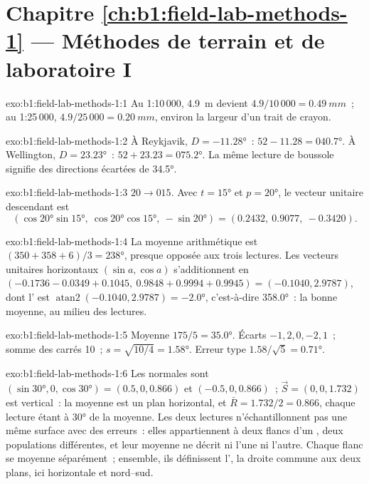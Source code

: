 \section*{Chapitre \ref{ch:b1:field-lab-methods-1} --- Méthodes de terrain et de laboratoire I}

\begin{solution}{exo:b1:field-lab-methods-1:1}
Au 1:10\,000, \qty{4.9}{m} devient $4.9/10\,000 = \qty{0.49}{mm}$~; au
1:25\,000, $4.9/25\,000 = \qty{0.20}{mm}$, environ la largeur d'un trait de crayon.
\end{solution}

\begin{solution}{exo:b1:field-lab-methods-1:2}
À Reykjavik, $D = \ang{-11.28}$~: $52 - 11.28 = \ang{040.7}$. À Wellington,
$D = \ang{+23.23}$~: $52 + 23.23 = \ang{075.2}$. La même lecture de boussole
signifie des directions écartées de \ang{34.5}.
\end{solution}

\begin{solution}{exo:b1:field-lab-methods-1:3}
$20\to015$. Avec $t = \ang{15}$ et $p = \ang{20}$, le vecteur unitaire descendant est
\[
  (\cos\ang{20}\sin\ang{15},\ \cos\ang{20}\cos\ang{15},\ -\sin\ang{20}) =
  (0.2432,\ 0.9077,\ -0.3420).
\]
\end{solution}

\begin{solution}{exo:b1:field-lab-methods-1:4}
La moyenne arithmétique est $(350 + 358 + 6)/3 = \ang{238}$, presque opposée aux
trois lectures. Les vecteurs unitaires horizontaux $(\sin a, \cos a)$ s'additionnent en
$(-0.1736 - 0.0349 + 0.1045,\ 0.9848 + 0.9994 + 0.9945) = (-0.1040, 2.9787)$,
dont l' est $\operatorname{atan2}(-0.1040, 2.9787) = \ang{-2.0}$, c'est-à-dire
\ang{358.0}~: la bonne moyenne, au milieu des lectures.
\end{solution}

\begin{solution}{exo:b1:field-lab-methods-1:5}
Moyenne $175/5 = \ang{35.0}$. Écarts $-1, 2, 0, -2, 1$~; somme des carrés 10~;
$s = \sqrt{10/4} = \ang{1.58}$. Erreur type $1.58/\sqrt5 = \ang{0.71}$.
\end{solution}

\begin{solution}{exo:b1:field-lab-methods-1:6}
Les normales sont $(\sin\ang{30}, 0, \cos\ang{30}) = (0.5, 0, 0.866)$ et
$(-0.5, 0, 0.866)$~; $\vec S = (0, 0, 1.732)$ est vertical~: la moyenne est un
plan horizontal, et $\bar R = 1.732/2 = 0.866$, chaque lecture étant à \ang{30}
de la moyenne. Les deux lectures n'échantillonnent pas une même surface avec des
erreurs~: elles appartiennent à deux flancs d'un , deux populations
différentes, et leur moyenne ne décrit ni l'une ni l'autre. Chaque flanc se
moyenne séparément~; ensemble, ils définissent l', la droite commune
aux deux plans, ici horizontale et nord--sud.
\end{solution}

